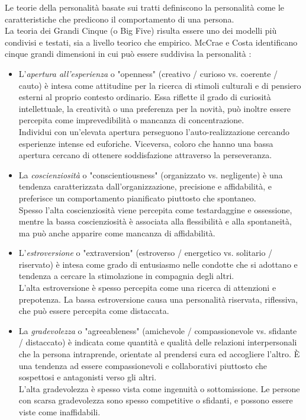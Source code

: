 Le teorie della personalità basate sui tratti definiscono la personalità come le caratteristiche che predicono il comportamento di una persona. 
\\
La teoria dei Grandi Cinque (o Big Five) risulta essere uno dei modelli più condivisi e testati, sia a livello teorico che empirico.
McCrae e Costa identificano cinque grandi dimensioni in cui può essere suddivisa la personalità \cite{goldberg1993structure,costa2008revised}:
\begin{itemize}
	\item L'\emph{apertura all'esperienza} o "openness" (creativo / curioso vs. coerente / cauto) è intesa come attitudine per la ricerca di stimoli culturali e di pensiero esterni al proprio contesto ordinario.
	Essa riflette il grado di curiosità intellettuale, la creatività o una preferenza per la novità, può inoltre essere percepita come imprevedibilità o mancanza di concentrazione. \\ 
	Individui con un'elevata apertura perseguono l'auto-realizzazione cercando esperienze intense ed euforiche. Viceversa, coloro che hanno una bassa apertura cercano di ottenere soddisfazione attraverso la perseveranza.
	
	\item La \emph{coscienziosità} o "conscientiousness" (organizzato vs. negligente) è una tendenza caratterizzata dall'organizzazione, precisione e affidabilità, e preferisce un comportamento pianificato piuttosto che spontaneo.\\  
	Spesso l'alta coscienziosità viene percepita come testardaggine e ossessione, mentre la bassa coscienziosità è associata alla flessibilità e alla spontaneità, ma può anche apparire come mancanza di affidabilità.
		
	\item L'\emph{estroversione} o "extraversion"  (estroverso / energetico vs. solitario / riservato) è intesa come grado di entusiasmo nelle condotte che si adottano e tendenza a cercare la stimolazione in compagnia degli altri.\\ 
	L'alta estroversione è spesso percepita come una ricerca di attenzioni e prepotenza. La bassa estroversione causa una personalità riservata, riflessiva, che può essere percepita come distaccata.  
	
	\item La \emph{gradevolezza} o "agreeableness" (amichevole / compassionevole vs. sfidante / distaccato) è indicata come quantità e qualità delle relazioni interpersonali che la persona intraprende, orientate al prendersi cura ed accogliere l'altro. È una	tendenza ad essere compassionevoli e collaborativi piuttosto che sospettosi e antagonisti verso gli altri. \\
	L'alta gradevolezza è spesso vista come ingenuità o sottomissione. Le persone con scarsa gradevolezza sono spesso competitive o sfidanti, e possono essere viste come inaffidabili.


\end{itemize}
